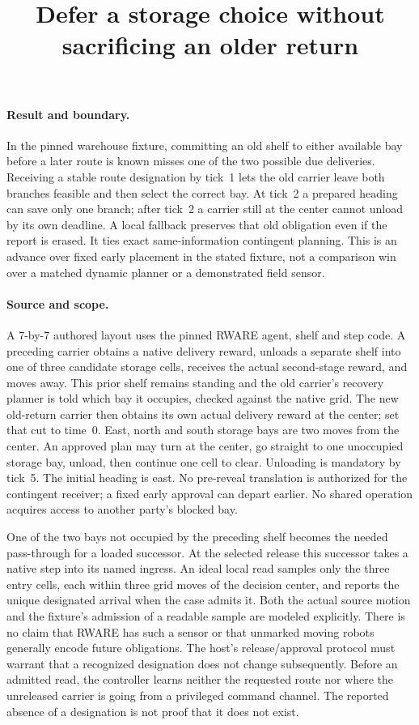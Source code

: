 \documentclass[11pt]{article}
\title{Defer a storage choice without sacrificing an older return}
\date{}
\begin{document}
\maketitle

\paragraph{Result and boundary.}
In the pinned warehouse fixture, committing an old shelf to either
available bay before a later route is known misses one of the two
possible due deliveries. Receiving a stable route designation by tick~1
lets the old carrier leave both branches feasible and then select
the correct bay. At tick~2 a prepared heading can save only one
branch; after tick~2 a carrier still at the center cannot unload
by its own deadline. A local fallback preserves that old obligation
even if the report is erased. It ties exact same-information
contingent planning. This is an advance over fixed early placement
in the stated fixture, not a comparison win over a matched
dynamic planner or a demonstrated field sensor.

\paragraph{Source and scope.}
A 7-by-7 authored layout uses the pinned RWARE agent, shelf and step
code. A preceding carrier obtains a native delivery reward, unloads a
separate shelf into one of three candidate storage cells, receives
the actual second-stage reward, and moves away. This prior shelf
remains standing and the old carrier's recovery planner is told
which bay it occupies, checked against the native grid. The new
old-return carrier then obtains its own actual delivery reward at
the center; set that cut to time~0. East, north and south storage
bays are two moves from the center. An approved plan may turn at
the center, go straight to one unoccupied storage bay, unload, then
continue one cell to clear. Unloading is mandatory by tick~5.
The initial heading is east. No pre-reveal translation is authorized
for the contingent receiver; a fixed early approval can depart earlier.
No shared operation acquires access to another party's blocked bay.

One of the two bays not occupied by the preceding shelf becomes
the needed pass-through for a loaded successor. At the selected
release this successor takes a native step into its named ingress.
An ideal local read samples only the three entry cells, each within
three grid moves of the decision center, and reports the unique
designated arrival when the case admits it. Both the actual
source motion and the fixture's admission of a readable sample are
modeled explicitly. There is no claim that RWARE has such a sensor
or that unmarked moving robots generally encode future obligations.
The host's release/approval protocol must warrant that a recognized
designation does not change subsequently. Before an admitted read,
the controller learns neither the requested route nor where the
unreleased carrier is going from a privileged command channel.
The reported absence of a designation is not proof that it
does not exist.
\end{document}
